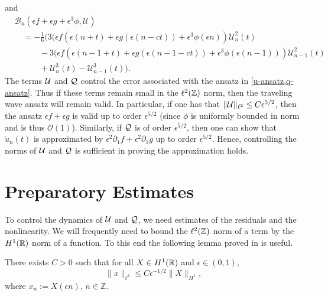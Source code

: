 and 
\begin{equation*}
\begin{aligned}
	&\mathcal B_n(\epsilon f + \epsilon g + \epsilon^3 \phi, \mathcal U) \\
	&\quad= -\frac 1 6 \Big( 3(\epsilon f(\epsilon(n+t) + \epsilon g(\epsilon(n-ct)) + \epsilon^3 \phi(\epsilon n))  \mathcal U^2_n(t) \\
	&\quad \qquad - 3(\epsilon f(\epsilon(n-1+t) + \epsilon g(\epsilon(n-1-ct)) + \epsilon^3 \phi(\epsilon (n-1)))  \mathcal U^2_{n-1}(t) \\
	&\quad\qquad + \mathcal U_n^3(t)  - \mathcal U_{n-1}^3(t)\Big).
\end{aligned}
\end{equation*}
The terms \(\mathcal{U}\) and \(\mathcal{Q}\) control the error associated with the ansatz in \cref{u-ansatz,q-ansatz}. Thus if these terms remain small in the \(\ell^2(\mathbb{Z})\) norm, then the traveling wave ansatz will remain valid. In particular, if one has that \(\|\mathcal{U}\|_{\ell^2} \leq C\epsilon^{5/2}\), then the ansatz \(\epsilon f + \epsilon g\) is valid up to order \(\epsilon^{5/2}\) (since \(\phi\) is uniformly bounded in norm and is thus \(\mathcal O (1)\)). Similarly, if \(\mathcal{Q}\) is of order \(\epsilon^{5/2}\), then one can show that \(\dot u_n(t)\) is approximated by \(\epsilon^2 \partial_1 f + \epsilon^2 \partial_1 g\) up to order \(\epsilon^{5/2}\). Hence, controlling the norms of \(\mathcal{U}\) and \(\mathcal{Q}\) is sufficient in proving the approximation holds.

\section{Preparatory Estimates}
 
To control the dynamics of \(\mathcal{U}\) and \(\mathcal{Q}\), we need estimates of the residuals and the nonlinearity. We will frequently need to bound the \(\ell^2(\mathbb{Z})\) norm of a term by the \(H^1(\mathbb{R})\) norm of a function. To this end the following lemma proved in \cite{dumas2014justification} is useful.
\begin{lem}\label{h1-ell2-ineq}
	There exists \(C>0\) such that for all \(X \in H^1(\mathbb{R})\) and \(\epsilon \in (0,1)\), \[\|x\|_{\ell^2} \leq C \epsilon^{-1/2} \|X\|_{H^1},\] where \(x_n := X(\epsilon n)\), \(n\in \mathbb Z\).
\end{lem}


